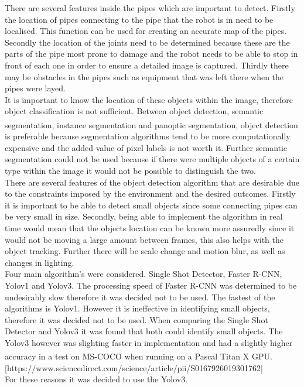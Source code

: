 \documentclass[11pt]{article}		%
\newcommand{\supercite}[1]{\textsuperscript{\cite{#1}}}		%
\begin{document}
			There are several features inside the pipes which are important to detect. 
			Firstly the location of pipes connecting to the pipe that the robot is in need to be localised. This function can be used for creating an accurate map of the pipes.
			Secondly the location of the joints need to be determined because these are the parts of the pipe most prone to damage and the robot needs to be able to stop in front of each one in order to ensure a detailed image is captured. 
			Thirdly there may be obstacles in the pipes such as equipment that was left there when the pipes were layed.
			\\
	        It is important to know the location of these objects within the image, therefore object classification is not sufficient. 
	        Between object detection, semantic segmentation, instance segmentation and panoptic segmentation\supercite{segmentation}, object detection is preferable because segmentation algorithms tend to be more computationally expensive and the added value of pixel labels is not worth it. 
	        Further semantic segmentation could not be used because if there were multiple objects of a certain type within the image it would not be possible to distinguish the two.
	        \\
	        There are several features of the object detection algorithm that are desirable due to the constraints imposed by the environment and the desired outcomes. 
	        Firstly it is important to be able to detect small objects since some connecting pipes can be very small in size. 
	        Secondly, being able to implement the algorithm in real time would mean that the objects location can be known more assuredly since it would not be moving a large amount between frames, this also helps with the object tracking. 
	        Further there will be scale change and motion blur, as well as changes in lighting.
	        \\
	        Four main algorithm’s were considered. 
	        Single Shot Detector, Faster R-CNN, Yolov1 and Yolov3. 
	        The processing speed of Faster R-CNN was determined to be undesirably slow therefore it was decided not to be used. 
	        The fastest of the algorithms is Yolov1. However it is ineffective in identifying small objects, therefore it was decided not to be used. 
	        When comparing the Single Shot Detector and Yolov3 it was found that both could identify small objects. 
	        The Yolov3 however was slighting faster in implementation and had a slightly higher accuracy in a test on MS-COCO when running on a Pascal Titan X GPU.\supercite{YOLO}[https://www.sciencedirect.com/science/article/pii/S0167926019301762]
	        \\
	        For these reasons it was decided to use the Yolov3.
	        
\end{document}
